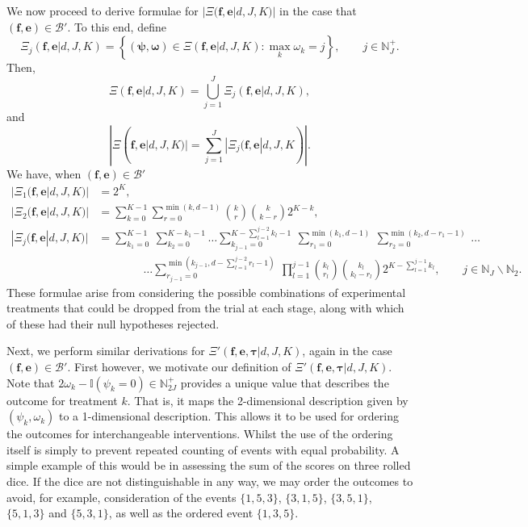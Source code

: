 \documentclass{article}
\numberwithin{equation}{section}
\theoremstyle{plain}
\begin{document}
We now proceed to derive formulae for $|\Xi(\boldsymbol{f},\boldsymbol{e}|d,J,K)|$ in the case that $(\boldsymbol{f},\boldsymbol{e})\in\mathscr{B}'$. To this end, define
\[ \Xi_j(\boldsymbol{f},\boldsymbol{e}|d,J,K) = \left\{ (\boldsymbol{\psi},\boldsymbol{\omega})\in\Xi(\boldsymbol{f},\boldsymbol{e}|d,J,K) : \max_k \omega_k=j \right\}, \qquad j\in\mathbb{N}_J^+. \]
Then,
\[ \Xi(\boldsymbol{f},\boldsymbol{e}|d,J,K)=\bigcup_{j=1}^J \Xi_j(\boldsymbol{f},\boldsymbol{e}|d,J,K), \]
and
\[ |\Xi(\boldsymbol{f},\boldsymbol{e}|d,J,K)|=\sum_{j=1}^J|\Xi_j(\boldsymbol{f},\boldsymbol{e}|d,J,K)|.\]
We have, when $(\boldsymbol{f},\boldsymbol{e})\in\mathscr{B}'$
\begin{align*}
|\Xi_1(\boldsymbol{f},\boldsymbol{e}|d,J,K)|&=2^K,\\
|\Xi_2(\boldsymbol{f},\boldsymbol{e}|d,J,K)|&=\sum_{k=0}^{K-1}\sum_{r=0}^{\min(k,d-1)}\binom{k}{r} \binom{k}{k-r}2^{K-k},\\
|\Xi_j(\boldsymbol{f},\boldsymbol{e}|d,J,K)|&=\sum_{k_1=0}^{K-1}\ \sum_{k_2=0}^{K-k_1-1}\dots\sum_{k_{j-1}=0}^{K-\sum_{l=1}^{j-2}k_l-1}\ \sum_{r_1=0}^{\min(k_1,d-1)}\ \sum_{r_2=0}^{\min(k_2,d-r_1-1)}\ \dots\\
& \qquad \qquad \dots \sum_{r_{j-1}=0}^{\min(k_{j-1},d-\sum_{l=1}^{j-2}r_l-1)}\ \prod_{l=1}^{j-1}\binom{k_l}{r_l}\binom{k_l}{k_l-r_l}2^{K-\sum_{l=1}^{j-1}k_l}, \qquad j\in\mathbb{N}_J\backslash\mathbb{N}_2.
\end{align*}
These formulae arise from considering the possible combinations of experimental treatments that could be dropped from the trial at each stage, along with which of these had their null hypotheses rejected.

Next, we perform similar derivations for $\Xi'(\boldsymbol{f},\boldsymbol{e},\boldsymbol{\tau}|d,J,K)$, again in the case $(\boldsymbol{f},\boldsymbol{e})\in\mathscr{B}'$. First however, we motivate our definition of $\Xi'(\boldsymbol{f},\boldsymbol{e},\boldsymbol{\tau}|d,J,K)$. Note that $2\omega_{k}-\mathbb{I}(\psi_{k}=0)\in\mathbb{N}_{2J}^+$ provides a unique value that describes the outcome for treatment $k$. That is, it maps the 2-dimensional description given by $(\psi_k,\omega_k)$ to a 1-dimensional description. This allows it to be used for ordering the outcomes for interchangeable interventions. Whilst the use of the ordering itself is simply to prevent repeated counting of events with equal probability. A simple example of this would be in assessing the sum of the scores on three rolled dice. If the dice are not distinguishable in any way, we may order the outcomes to avoid, for example, consideration of the events $\{1,5,3\}$, $\{3,1,5\}$, $\{3,5,1\}$, $\{5,1,3\}$ and $\{5,3,1\}$, as well as the ordered event $\{1,3,5\}$.
\end{document}
